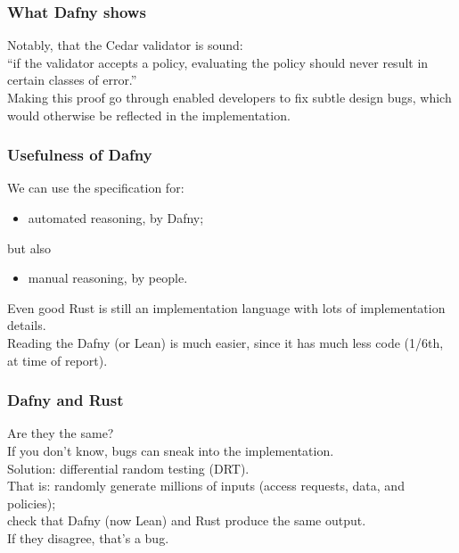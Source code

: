 \documentclass{beamer}
\newenvironment{changemargin}[1]{%
  \begin{list}{}{%
    \setlength{\topsep}{0pt}%
    \setlength{\leftmargin}{#1}%
    \setlength{\rightmargin}{1em}
    \setlength{\listparindent}{\parindent}%
    \setlength{\itemindent}{\parindent}%
    \setlength{\parsep}{\parskip}%
  }%
  \item[]}{\end{list}}
\begin{document}
\begin{frame}[fragile]
  \frametitle{What Dafny shows}
  \Large
  \begin{changemargin}{2cm}
    Notably, that the Cedar validator is sound:\\[1em]
    ``if the validator accepts a policy, evaluating the policy should never result in certain classes of error.''\\[1em]

    Making this proof go through enabled developers to fix subtle design bugs, which would otherwise be reflected in the implementation.
  \end{changemargin}
\end{frame}

\begin{frame}[fragile]
  \frametitle{Usefulness of Dafny}
  \Large
  \begin{changemargin}{2cm}
    We can use the specification for:
    \begin{itemize}
    \item automated reasoning, by Dafny;
      \end{itemize}
      but also
    \begin{itemize}
      \item manual reasoning, by people.
    \end{itemize}

    Even good Rust is still an implementation language with lots of implementation details.\\[1em]

Reading the Dafny (or Lean) is much easier, since it has much less code (1/6th, at time of report).
  \end{changemargin}
\end{frame}

\begin{frame}[fragile]
  \frametitle{Dafny and Rust}
  \large
  \begin{changemargin}{1cm}
    Are they the same?\\[1em]
    If you don't know, bugs can sneak into the implementation.\\[1em]
    Solution: \alert{differential random testing} (DRT).\\[1em]

    That is: randomly generate millions of inputs (access requests, data, and policies);\\
    check that Dafny (now Lean) and Rust produce the same output.\\
    If they disagree, that's a bug.\\[1em]
  \end{changemargin}
\end{frame}
\end{document}
